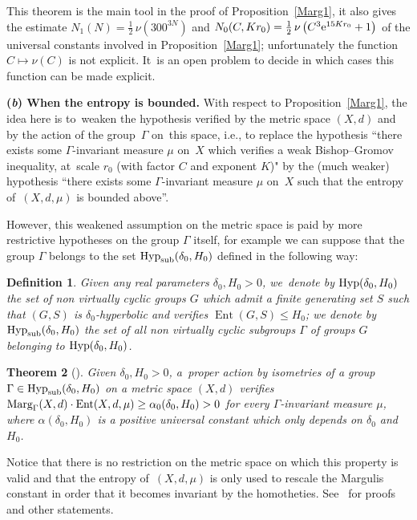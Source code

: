 \documentclass[10pt,a4paper]{amsart}
\numberwithin{equation}{section}
\newtheorem{theor}{Theorem}[section]
\newtheorem{defi}[theor]{Definition}
\newcommand{\Ent}{\operatorname{Ent}}
\begin{document}
This theorem is the main tool in the proof of Proposition~\ref{Marg1}, it
also gives the estimate $N_1 (N) = \frac{1}{2} \,\nu \left(300^{3N}\right)$
and $N_0 (C, K r_0) = \frac{1}{2} \,\nu \left(C^3 {\rm e}^{15 K r_0} + 1\right)$ of the
universal constants involved in Proposition~\ref{Marg1}; unfortunately the function $C \mapsto \nu (C)$ is not explicit. It~is an open problem to decide in
which cases this function can be made explicit.

\medskip\noindent
{\bf (\emph{b}) When the entropy is bounded.}
With respect to Proposition~\ref{Marg1}, the idea here is to~weaken the hypothesis verified by the metric space $(X,d)$ and by the action of the group~$\Gamma$ on~this space, i.e., to replace the hypothesis ``there exists some $\Gamma$-invariant measure $\mu$ on~$X$ which verifies a weak Bishop--Gromov inequality, at~scale $r_0$ (with factor $C$ and exponent $K$)"
by the (much weaker) hypothesis ``there exists some
$\Gamma$-invariant measure $\mu$ on~$X$ such that the entropy of~$(X,d, \mu)$ is bounded above''.

However, this weakened assumption on the metric space is paid by more restrictive hypotheses on the group $\Gamma$ itself, for example we can suppose
that the group $\Gamma$ belongs to the set $\text{\rm Hyp}_{\rm sub} (\delta_0, H_0)$ defined in the following way:

\begin{defi}%
Given any real parameters $\delta_0, H_0 > 0$, we~denote by $\text{\rm Hyp} (\delta_0, H_0)$ the set of non virtually cyclic groups $G$ which admit a
finite generating set $S$ such that $(G, S)$ is $\delta_0$-hyperbolic and verifies $\Ent (G, S) \le H_0 $; we denote by $\text{\rm Hyp}_{\rm sub}
(\delta_0, H_0)$ the set of all non virtually cyclic subgroups $\Gamma$ of groups $G$ belonging to $\text{\rm Hyp}(\delta_0, H_0)$.
\end{defi}

\begin{theor}[{\cite[Theorem~6.13(ii)]{BCGS}}]\label{transportnil}
Given $\delta_0, H_0 > 0$, a~proper action by isometries of a group $\Gamma \in \text{\rm Hyp}_{\rm sub} (\delta_0, H_0)$ on
a metric space $ (X, d) $ verifies $\text{\rm Marg}_\Gamma (X, d) \cdot
\Ent (X,d, \mu) \ge \alpha_0 (\delta_0, H_0) > 0$ for every $\Gamma$-invariant
measure $\mu$, where $\alpha (\delta_0, H_0)$ is a positive universal constant which only depends on $\delta_0$ and $H_0$.
\end{theor}
Notice that there is no restriction on the metric space on which this property is valid and that the entropy of~$(X,d, \mu)$ is only used to rescale the Margulis
constant in order that it becomes invariant by the homotheties.
See~\cite[Theorem~6.13]{BCGS} for proofs and other statements.
\end{document}
